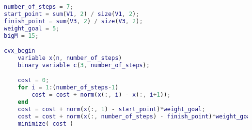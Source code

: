 \begin{lstlisting}[language=Matlab]
number_of_steps = 7; 
start_point = sum(V1, 2) / size(V1, 2);
finish_point = sum(V3, 2) / size(V3, 2);
weight_goal = 5;
bigM = 15;

cvx_begin
    variable x(n, number_of_steps)
    binary variable c(3, number_of_steps);

    cost = 0;
    for i = 1:(number_of_steps-1)
        cost = cost + norm(x(:, i) - x(:, i+1));
    end
    cost = cost + norm(x(:, 1) - start_point)*weight_goal;
    cost = cost + norm(x(:, number_of_steps) - finish_point)*weight_goal;
    minimize( cost )
\end{lstlisting}
